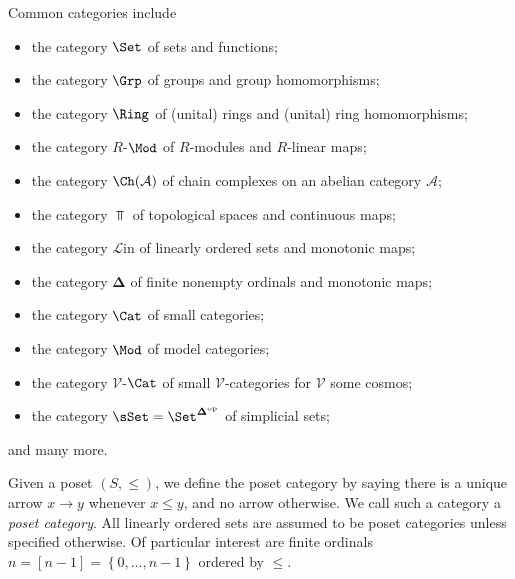 \begin{example}
	Common categories include
	\begin{itemize}
		\item the category $\Set $ of sets and functions;
		\item the category $\Grp $ of groups and group homomorphisms;
		\item the category $\Ring $ of (unital) rings and (unital) ring homomorphisms;
		\item the category $R$-$\Mod$ of $R$-modules and $R$-linear maps;
		\item the category $\Ch(\mathcal{A} ) $ of chain complexes on an abelian category $\mathcal{A} $;
		\item the category $\Top $ of topological spaces and continuous maps;
		\item the category $\mathcal{L} \mathrm{in} $ of linearly ordered sets and monotonic maps;
		\item the category $\boldsymbol{\Delta} $ of finite nonempty ordinals and monotonic maps;
		\item the category $\Cat $ of small categories;
		\item the category $\Mod$ of model categories;
		\item the category $\mathcal{V} $-$\Cat $ of small $\mathcal{V} $-categories for $\mathcal{V} $ some cosmos;
		\item the category $\sSet =\Set ^{\boldsymbol{\Delta}^{\mathrm{op}} } $ of simplicial sets;
	\end{itemize}
	and many more.
\end{example}

Given a poset $(S,\leq )$, we define the poset category by saying there is a unique arrow $x\to y$ whenever $x\leq y$, and no arrow otherwise. We call such a category a \emph{poset category}. All linearly ordered sets are assumed to be poset categories unless specified otherwise. Of particular interest are finite ordinals $n=[n-1]=\left\{ 0, \ldots ,n-1 \right\} $ ordered by $\leq $.


